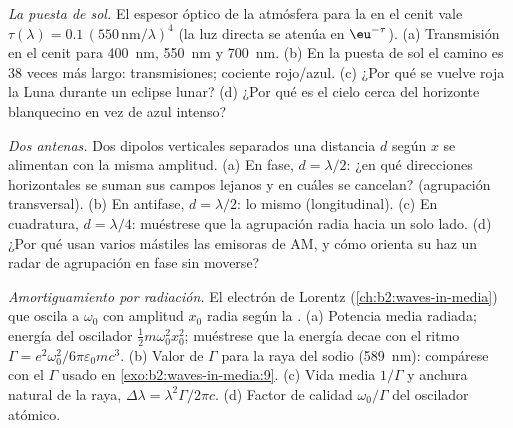 \begin{exercise}[$\star\star$]\label{exo:b2:dipole-radiation:8}
\emph{La puesta de sol.} El espesor óptico de la atmósfera para la  en el cenit vale $\tau(\lambda) = 0.1\,(550\,\text{nm}/\lambda)^4$ (la
luz directa se atenúa en $\eu^{-\tau}$). (a) Transmisión en el
cenit para \qty{400}{nm}, \qty{550}{nm} y \qty{700}{nm}. (b) En la puesta de sol el camino
es $38$ veces más largo: transmisiones; cociente rojo/azul. (c) ¿Por qué se
vuelve roja la Luna durante un eclipse lunar? (d) ¿Por qué es el cielo cerca del
horizonte blanquecino en vez de azul intenso?
\end{exercise}

\begin{exercise}[$\star\star$]\label{exo:b2:dipole-radiation:9}
\emph{Dos antenas.} Dos dipolos verticales separados una distancia $d$ según
$x$ se alimentan con la misma amplitud. (a) En fase, $d = \lambda/2$: ¿en qué
direcciones horizontales se suman sus campos lejanos y en cuáles se cancelan?
(agrupación transversal). (b) En antifase, $d = \lambda/2$: lo mismo (longitudinal).
(c) En cuadratura, $d = \lambda/4$: muéstrese que la agrupación radia hacia un
solo lado. (d) ¿Por qué usan varios mástiles las emisoras de AM, y
cómo orienta su haz un radar de agrupación en fase sin moverse?
\end{exercise}

\begin{exercise}[$\star\star\star$]\label{exo:b2:dipole-radiation:10}
\emph{Amortiguamiento por radiación.} El electrón de Lorentz (\cref{ch:b2:waves-in-media})
que oscila a $\omega_0$ con amplitud $x_0$ radia según la .
(a) Potencia media radiada; energía del oscilador $\tfrac12m\omega_0^2x_0^2$;
muéstrese que la energía decae con el ritmo $\Gamma = e^2\omega_0^2/6\pi\varepsilon_0mc^3$.
(b) Valor de $\Gamma$ para la raya del sodio (\qty{589}{nm}): compárese con el
$\Gamma$ usado en \cref{exo:b2:waves-in-media:9}. (c) Vida media $1/\Gamma$ y anchura
natural de la raya, $\Delta\lambda = \lambda^2\Gamma/2\pi c$. (d) Factor de calidad
$\omega_0/\Gamma$ del oscilador atómico.
\end{exercise}

